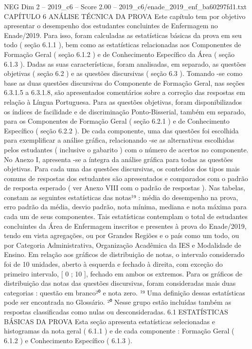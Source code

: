 \begin{textsample}{NEG Dim 2 – 2019\_c6 – Score 2.00 – 2019\_c6/enade\_2019\_enf\_ba60297fd1.txt}  \label{ex:f2_neg_281}
CAPÍTULO 6 ANÁLISE TÉCNICA DA PROVA Este capítulo tem por objetivo apresentar o desempenho dos estudantes concluintes de Enfermagem no Enade/2019.
Para isso, foram calculadas as estatísticas básicas da prova em seu todo ( seção 6.1.1 ), bem como as estatísticas relacionadas aos Componentes de Formação Geral ( seção 6.1.2 ) e de Conhecimento Específico da Área ( seção 6.1.3 ).
Dadas as suas características, foram analisadas, em separado, as questões objetivas ( seção 6.2 ) e as questões discursivas ( seção 6.3 ).
Tomando -se como base as duas questões discursivas do Componente de Formação Geral, nas seções 6.3.1.5 a 6.3.1.8, são apresentados comentários sobre a correção das respostas em relação à Língua Portuguesa.
Para as questões objetivas, foram disponibilizados os índices de facilidade e de discriminação Ponto-Bisserial, também em separado, para os Componentes de Formação Geral ( seção 6.2.1 ) e de Conhecimento Específico ( seção 6.2.2 ).
De cada componente, uma das questões foi escolhida para exemplificar a análise gráfica, relacionando -se as alternativas escolhidas pelos estudantes ( inclusive o gabarito ) com o número de acertos no componente.
No Anexo I, apresenta -se a íntegra da análise gráfica para todas as questões objetivas.
Para cada uma das questões discursivas, os conteúdos dos tipos mais comuns de respostas dos estudantes são apresentados e comparados com o padrão de resposta esperado ( ver Anexo VIII com o padrão de respostas ).
Nas tabelas, constam as seguintes estatísticas das notas¹⁹ : média do desempenho na prova, erro padrão da média, desvio padrão, nota mínima, mediana e nota máxima para cada um de seus componentes.
Tais estatísticas contemplam o total de estudantes concluintes da Área de Enfermagem inscritos e presentes à prova do Enade/2019, tendo em vista agregações, ou por Grandes Regiões e o país como um todo, ou por Categoria Administrativa, Organização Acadêmica da IES e Modalidade de Ensino.
Em relação aos gráficos de distribuição de notas, o intervalo considerado foi de 10 unidades, aberto à esquerda e fechado à direita, com exceção do primeiro intervalo, [ 0 ; 10 ], fechado em ambos os extremos.
Para os gráficos de distribuição das notas das questões discursivas, foram consideradas mais duas categorias : questão em branco²⁰ e nota zero. ¹⁹ Uma definição dessas estatísticas pode ser encontrada no Glossário. ²⁰ Nesse grupo estão incluídas também as respostas classificadas como nulas ou desconsideradas. 6.1 ESTATÍSTICAS BÁSICAS DA PROVA Esta seção apresenta estatísticas selecionadas e histogramas da nota geral ( 6.1.1 ) e de cada componente : Formação Geral ( 6.1.2 ) e Conhecimento Específico ( 6.1.3 ).

\end{textsample}
